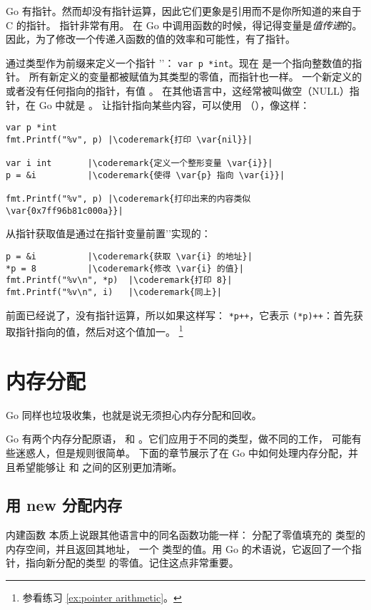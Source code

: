 \noindent{}
Go 有指针。然而却没有指针运算，因此它们更象是引用而不是你所知道的来自于 C 的指针。
指针非常有用。
在 Go 中调用函数的时候，得记得变量是\emph{值传递}的。
因此，为了修改一个传递\emph{入}函数的值的效率和可能性，有了指针。

通过类型作为前缀来定义一个指针 '\key{*}'：
\lstinline{var p *int}。现在  是一个指向整数值的指针。
所有新定义的变量都被赋值为其类型的零值，而指针也一样。
一个新定义的或者没有任何指向的指针，有值 。
在其他语言中，这经常被叫做空（NULL）指针，在 Go 中就是 。
让指针指向某些内容，可以使用
（\func{\&}），像这样：
\begin{lstlisting}[caption=指针的使用,label=src:pointers]
var p *int
fmt.Printf("%v", p) |\coderemark{打印 \var{nil}}|

var i int	    |\coderemark{定义一个整形变量 \var{i}}|
p = &i		    |\coderemark{使得 \var{p} 指向 \var{i}}|

fmt.Printf("%v", p) |\coderemark{打印出来的内容类似 \var{0x7ff96b81c000a}}|
\end{lstlisting}
从指针获取值是通过在指针变量前置'\type{*}'实现的：
\begin{lstlisting}[caption=获取指针指向的值,label=src:deref]
p = &i			|\coderemark{获取 \var{i} 的地址}|
*p = 8			|\coderemark{修改 \var{i} 的值}|
fmt.Printf("%v\n", *p)  |\coderemark{打印 8}|
fmt.Printf("%v\n", i)	|\coderemark{同上}|
\end{lstlisting}

\label{main:pointer arithmetic}
前面已经说了，没有指针运算，所以如果这样写：
\lstinline{*p++}，它表示 \lstinline{(*p)++}：首先获取指针指向的值，然后对这个值加一。
\footnote{参看练习 \ref{ex:pointer arithmetic}。}

\section{内存分配}
Go 同样也垃圾收集，也就是说无须担心内存分配和回收。

Go 有两个内存分配原语， 和 。它们应用于不同的类型，做不同的工作，
可能有些迷惑人，但是规则很简单。
下面的章节展示了在 Go 中如何处理内存分配，并且希望能够让
 和  之间的区别更加清晰。

\subsection{用 new 分配内存}
\label{sec:allocation with new}
内建函数  本质上说跟其他语言中的同名函数功能一样：
 分配了零值填充的  类型的内存空间，并且返回其地址，
一个  类型的值。用 Go 的术语说，它返回了一个指针，指向新分配的类型 
的零值。记住这点非常重要。

